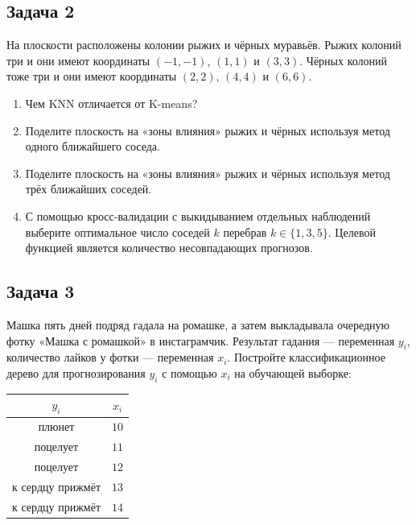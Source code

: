 \documentclass[12pt, a4paper, oneside]{article}
\begin{document}
\subsection*{Задача 2}

На плоскости расположены колонии рыжих и чёрных муравьёв. Рыжих колоний три и они имеют координаты $(-1, -1)$, $(1, 1)$ и $(3, 3)$. Чёрных колоний тоже три и они имеют координаты $(2, 2)$, $(4, 4)$ и $(6, 6)$.

\begin{enumerate}
	\item Чем KNN отличается от K-means? 
	\item Поделите плоскость на «зоны влияния» рыжих и чёрных используя метод одного ближайшего соседа.
	\item Поделите плоскость на «зоны влияния» рыжих и чёрных используя метод трёх ближайших соседей.
	\item С помощью кросс-валидации с выкидыванием отдельных наблюдений выберите оптимальное число соседей $k$ перебрав $k \in \{1, 3, 5\}$. Целевой функцией является количество несовпадающих прогнозов.
\end{enumerate}





\subsection*{Задача 3}

Машка пять дней подряд гадала на ромашке, а затем выкладывала очередную фотку «Машка с ромашкой» в инстаграмчик. Результат гадания — переменная $y_i$, количество лайков у фотки — переменная $x_i$. Постройте классификационное дерево для прогнозирования $y_i$ с помощью $x_i$ на обучающей выборке:

\begin{center}
\begin{tabular}{cc}
	$y_i$ & $x_i$ \\
	\hline
	плюнет & $10$ \\
	поцелует & $11$ \\
	поцелует & $12$ \\
	к сердцу прижмёт & $13$ \\
	к сердцу прижмёт & $14$ \\
\end{tabular}
\end{center}
\end{document}
